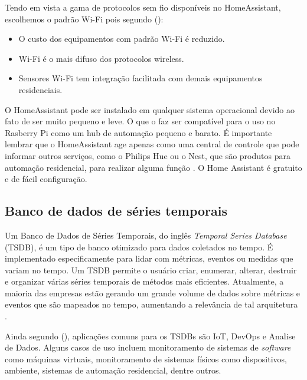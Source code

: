 
Tendo em vista a gama de protocolos sem fio disponíveis no HomeAssistant, escolhemos o padrão Wi-Fi pois segundo \citeauthor{Lundrigan2017} (\citeyear{Lundrigan2017}):

\begin{itemize}
	\item O custo dos equipamentos com padrão Wi-Fi é reduzido.
	\item Wi-Fi é o mais difuso dos protocolos wireless.
	\item Sensores Wi-Fi tem integração facilitada com demais equipamentos residenciais.
\end{itemize}

O HomeAssistant pode ser instalado em qualquer sistema operacional devido ao fato de ser muito pequeno e leve. O que o faz ser compatível para o uso no Rasberry Pi como um hub de automação pequeno e barato. É importante lembrar que o HomeAssistant age apenas como uma central de controle que pode informar outros serviços, como o Philips Hue ou o Nest, que são produtos para automação residencial, para realizar alguma função \cite{AlmeidaCosta}. O Home Assistant é gratuito e de fácil configuração.

\subsection{Banco de dados de séries temporais}

Um Banco de Dados de Séries Temporais, do inglês \textit{Temporal Series Database} (TSDB), é um tipo de banco otimizado para dados coletados no tempo. É implementado especificamente para lidar com métricas, eventos ou medidas que variam no tempo. Um TSDB permite o usuário criar, enumerar, alterar, destruir e organizar várias séries temporais de métodos mais eficientes. Atualmente, a maioria das empresas estão gerando um grande volume de dados sobre métricas e eventos que são mapeados no tempo, aumentando a relevância de tal arquitetura \cite{Noor2017}.

Ainda segundo \citeauthor{Noor2017} (\citeyear{Noor2017}), aplicações comuns para os TSDBs são IoT, DevOps e Analise de Dados. Alguns casos de uso incluem monitoramento de sistemas de \textit{software} como máquinas virtuais, monitoramento de sistemas físicos como dispositivos, ambiente, sistemas de automação residencial, dentre outros.

